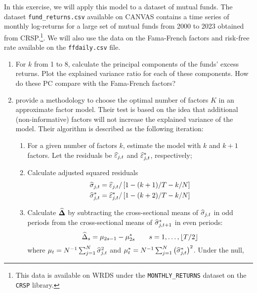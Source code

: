In this exercise, we will apply this model to a dataset of mutual funds. The dataset \texttt{fund\_returns.csv} available on CANVAS contains a time series of monthly log-returns for a large set of mutual funds from 2000 to 2023 obtained from CRSP.\footnote{This data is available on WRDS under the \texttt{MONTHLY\_RETURNS} dataset on the \texttt{CRSP} library.}. We will also use the data on the Fama-French factors and risk-free rate available on the \texttt{ffdaily.csv} file.

\begin{enumerate}[label = \Alph*)]
    \item For \(k\) from 1 to 8, calculate the principal components of the funds' excess returns. Plot the explained variance ratio for each of these components. How do these PC compare with the Fama-French factors?
    \item \citet{connor1993test} provide a methodology to choose the optimal number of factors \(K\) in an approximate factor model. Their test is based on the idea that additional (non-informative) factors will not increase the explained variance of the model. Their algorithm is described as the following iteration:
    \begin{enumerate}[label = \arabic*), leftmargin = *]
        \item For a given number of factors \(k\), estimate the model with \(k\) and \(k+1\) factors. Let the residuals be \(\widehat{\varepsilon}_{j,t}\) and \(\widehat{\varepsilon}^\ast_{j,t}\), respectively;
        \item Calculate adjusted squared residuals
        \begin{equation}
            \begin{aligned}
                \widehat{\sigma}_{j,t} & = \widehat{\varepsilon}_{j,t}/\left[ 1-(k+1)/T-k/N \right] \\
                \widehat{\sigma}_{j,t}^\ast & = \widehat{\varepsilon}_{j,t}^\ast/\left[ 1-(k+2)/T-k/N \right]
            \end{aligned}
        \end{equation}
        \item Calculate \(\mathbf{\widehat{\Delta}}\) by subtracting the cross-sectional means of \(\widehat{\sigma}_{j,t}\) in odd periods from the cross-sectional means of \(\widehat{\sigma}_{j, t+1}^\ast\) in even periods:
        \begin{equation}
            \widehat{\Delta}_s = \mu_{2s-1} - \mu_{2s}^\ast \qquad s = 1, \dots, \left\lfloor T/2 \right\rfloor
        \end{equation}
        where \(\mu_t = N^{-1}\sum_{j=1}^N\widehat{\sigma}_{j,t}^2\) and \(\mu_t^\ast = N^{-1}\sum_{j=1}^N\left( \widehat{\sigma}_{j,t}^\ast \right)^2\). Under the null,

\end{enumerate}
\end{enumerate}

